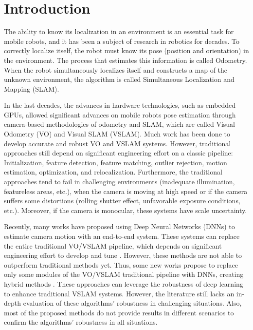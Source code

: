 \section{Introduction}
\label{sec:introduction}

The ability to know its localization in an environment is an essential task for mobile robots, and it has been a subject of research in robotics for decades. To correctly localize itself, the robot must know its pose (position and orientation) in the environment. The process that estimates this information is called Odometry. When the robot simultaneously localizes itself and constructs a map of the unknown environment, the algorithm is called Simultaneous Localization and Mapping (SLAM).

In the last decades, the advances in hardware technologies, such as embedded GPUs, allowed significant advances on mobile robots pose estimation through camera-based methodologies of odometry and SLAM, which are called Visual Odometry (VO) and Visual SLAM (VSLAM). Much work has been done to develop accurate and robust VO and VSLAM systems. However, traditional approaches still depend on significant engineering effort on a classic pipeline: Initialization, feature detection, feature matching, outlier rejection, motion estimation, optimization, and relocalization. Furthermore, the traditional approaches tend to fail in challenging environments (inadequate illumination, featureless areas, etc.), when the camera is moving at high speed or if the camera suffers some distortions (rolling shutter effect, unfavorable exposure conditions, etc.). Moreover, if the camera is monocular, these systems have scale uncertainty.

Recently, many works have proposed using Deep Neural Networks (DNNs) to estimate camera motion with an end-to-end system. These systems can replace the entire traditional VO/VSLAM pipeline, which depends on significant engineering effort to develop and tune \cite{undeep-vo, attention-based, deep-vo}. However, these methods are not able to outperform traditional methods yet. Thus, some new works propose to replace only some modules of the VO/VSLAM traditional pipeline with DNNs, creating hybrid methods \cite{self-improving-vo, df-slam, pose-graph-optimization, gcnv2}. These approaches can leverage the robustness of deep learning to enhance traditional VSLAM systems. However, the literature still lacks an in-depth evaluation of these algorithms' robustness in challenging situations. Also, most of the proposed methods do not provide results in different scenarios to confirm the algorithms' robustness in all situations.

